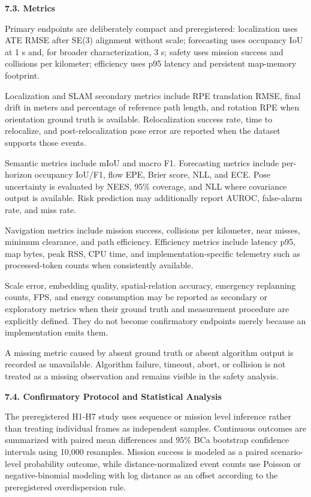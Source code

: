 \documentclass[
]{article}
\begin{document}
\textbf{7.3. Metrics}

Primary endpoints are deliberately compact and preregistered:
localization uses ATE RMSE after SE(3) alignment without scale;
forecasting uses occupancy IoU at 1 s and, for broader characterization,
3 s; safety uses mission success and collisions per kilometer;
efficiency uses p95 latency and persistent map-memory footprint.

Localization and SLAM secondary metrics include RPE translation RMSE,
final drift in meters and percentage of reference path length, and
rotation RPE when orientation ground truth is available. Relocalization
success rate, time to relocalize, and post-relocalization pose error are
reported when the dataset supports those events.

Semantic metrics include mIoU and macro F1. Forecasting metrics include
per-horizon occupancy IoU/F1, flow EPE, Brier score, NLL, and ECE. Pose
uncertainty is evaluated by NEES, 95\% coverage, and NLL where
covariance output is available. Risk prediction may additionally report
AUROC, false-alarm rate, and miss rate.

Navigation metrics include mission success, collisions per kilometer,
near misses, minimum clearance, and path efficiency. Efficiency metrics
include latency p95, map bytes, peak RSS, CPU time, and
implementation-specific telemetry such as processed-token counts when
consistently available.

Scale error, embedding quality, spatial-relation accuracy, emergency
replanning counts, FPS, and energy consumption may be reported as
secondary or exploratory metrics when their ground truth and measurement
procedure are explicitly defined. They do not become confirmatory
endpoints merely because an implementation emits them.

A missing metric caused by absent ground truth or absent algorithm
output is recorded as unavailable. Algorithm failure, timeout, abort, or
collision is not treated as a missing observation and remains visible in
the safety analysis.

\textbf{7.4. Confirmatory Protocol and Statistical Analysis}

The preregistered H1-H7 study uses sequence or mission level inference
rather than treating individual frames as independent samples.
Continuous outcomes are summarized with paired mean differences and 95\%
BCa bootstrap confidence intervals using 10,000 resamples. Mission
success is modeled as a paired scenario-level probability outcome, while
distance-normalized event counts use Poisson or negative-binomial
modeling with log distance as an offset according to the preregistered
overdispersion rule.
\end{document}
